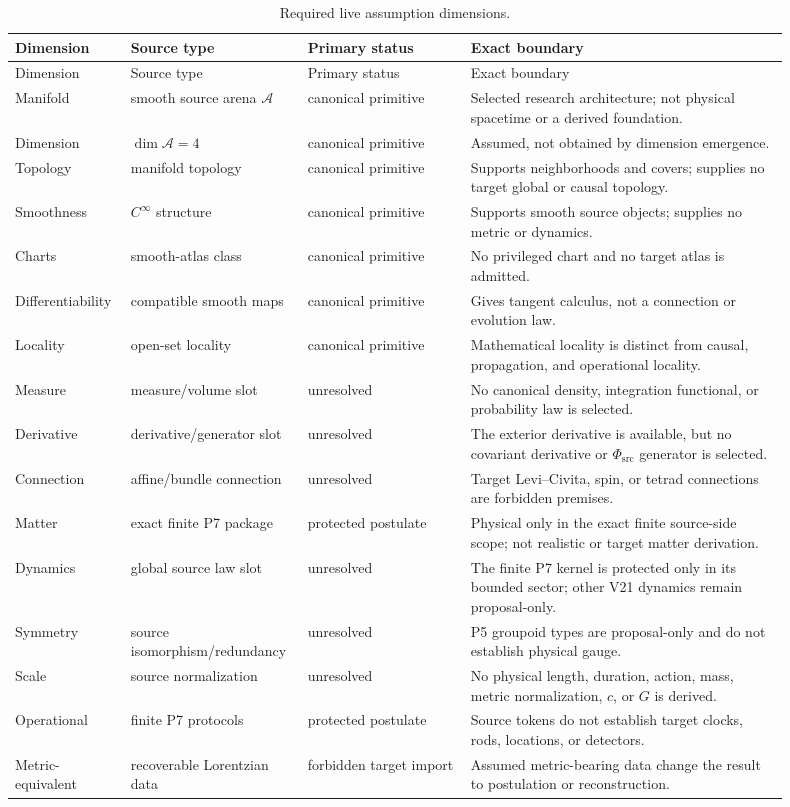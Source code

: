 \documentclass[11pt]{article}
\newcommand{\A}{\mathcal A}
\newcommand{\PhiSrc}{\Phi_{\mathrm{src}}}
\begin{document}
\small
\begin{longtable}{@{}p{0.13\linewidth}p{0.18\linewidth}p{0.20\linewidth}p{0.39\linewidth}@{}}
\caption{Required live assumption dimensions.}\label{tab:debt}\\
\toprule
Dimension & Source type & Primary status & Exact boundary \\
\midrule
\endfirsthead
\toprule
Dimension & Source type & Primary status & Exact boundary \\
\midrule
\endhead
Manifold & smooth source arena \(\A\) & canonical primitive & Selected research architecture; not physical spacetime or a derived foundation.\\
Dimension & \(\dim\A=4\) & canonical primitive & Assumed, not obtained by dimension emergence.\\
Topology & manifold topology & canonical primitive & Supports neighborhoods and covers; supplies no target global or causal topology.\\
Smoothness & \(C^\infty\) structure & canonical primitive & Supports smooth source objects; supplies no metric or dynamics.\\
Charts & smooth-atlas class & canonical primitive & No privileged chart and no target atlas is admitted.\\
Differentiability & compatible smooth maps & canonical primitive & Gives tangent calculus, not a connection or evolution law.\\
Locality & open-set locality & canonical primitive & Mathematical locality is distinct from causal, propagation, and operational locality.\\
Measure & measure/volume slot & unresolved & No canonical density, integration functional, or probability law is selected.\\
Derivative & derivative/generator slot & unresolved & The exterior derivative is available, but no covariant derivative or \(\PhiSrc\) generator is selected.\\
Connection & affine/bundle connection & unresolved & Target Levi--Civita, spin, or tetrad connections are forbidden premises.\\
Matter & exact finite P7 package & protected postulate & Physical only in the exact finite source-side scope; not realistic or target matter derivation.\\
Dynamics & global source law slot & unresolved & The finite P7 kernel is protected only in its bounded sector; other V21 dynamics remain proposal-only.\\
Symmetry & source isomorphism/redundancy & unresolved & P5 groupoid types are proposal-only and do not establish physical gauge.\\
Scale & source normalization & unresolved & No physical length, duration, action, mass, metric normalization, \(c\), or \(G\) is derived.\\
Operational & finite P7 protocols & protected postulate & Source tokens do not establish target clocks, rods, locations, or detectors.\\
Metric-equivalent & recoverable Lorentzian data & forbidden target import & Assumed metric-bearing data change the result to postulation or reconstruction.\\
\bottomrule
\end{longtable}
\end{document}
